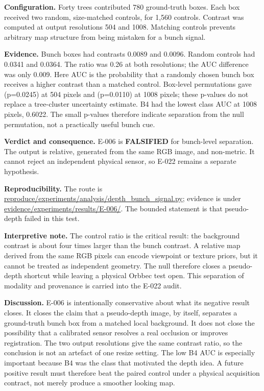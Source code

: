 \documentclass[preprint,12pt]{elsarticle}
\newcommand{\pathcode}[1]{\scriptsize\url{#1}}
\begin{document}
\textbf{Configuration.} Forty trees contributed 780 ground-truth boxes. Each
box received two random, size-matched controls, for 1,560 controls. Contrast
was computed at output resolutions 504 and 1008. Matching controls prevents
arbitrary map structure from being mistaken for a bunch signal.

\textbf{Evidence.} Bunch boxes had contrasts 0.0089 and 0.0096. Random controls
had 0.0341 and 0.0364. The ratio was 0.26 at both resolutions; the AUC
difference was only 0.009. Here AUC is the probability that a randomly chosen
bunch box receives a higher contrast than a matched control. Box-level
permutations gave (p=0.0245) at 504 pixels and (p=0.0110) at 1008 pixels;
these p-values do not replace a tree-cluster uncertainty estimate. B4 had the
lowest class AUC at 1008 pixels, 0.6022. The small p-values therefore indicate
separation from the null permutation, not a practically useful bunch cue.

\textbf{Verdict and consequence.} E-006 is \textbf{FALSIFIED} for bunch-level
separation. The output is relative, generated from the same RGB image, and
non-metric. It cannot reject an independent physical sensor, so E-022 remains
a separate hypothesis.

\textbf{Reproducibility.} The route is
\pathcode{reproduce/experiments/analysis/depth_bunch_signal.py}; evidence is
under \pathcode{evidence/experiments/results/E-006/}. The bounded statement is
that pseudo-depth failed in this test.

\textbf{Interpretive note.} The control ratio is the critical result: the
background contrast is about four times larger than the bunch contrast. A
relative map derived from the same RGB pixels can encode viewpoint or texture
priors, but it cannot be treated as independent geometry. The null therefore
closes a pseudo-depth shortcut while leaving a physical Orbbec test open.
This separation of modality and provenance is carried into the E-022 audit.

\textbf{Discussion.} E-006 is intentionally conservative about what its
negative result closes. It closes the claim that a pseudo-depth image, by
itself, separates a ground-truth bunch box from a matched local background. It
does not close the possibility that a calibrated sensor resolves a real
occlusion or improves registration. The two output resolutions give the same
contrast ratio, so the conclusion is not an artefact of one resize setting.
The low B4 AUC is especially important because B4 was the class that motivated
the depth idea. A future positive result must therefore beat the paired
control under a physical acquisition contract, not merely produce a smoother
looking map.
\end{document}
